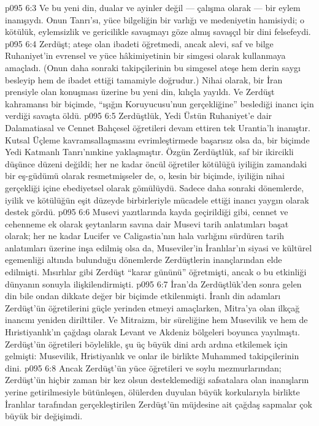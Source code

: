 \vs p095 6:3 Ve bu yeni din, dualar ve ayinler değil --- çalışma olarak --- bir eylem inanışıydı. Onun Tanrı’sı, yüce bilgeliğin bir varlığı ve medeniyetin hamisiydi; o kötülük, eylemsizlik ve gericilikle savaşmayı göze almış savaşçıl bir dini felsefeydi.
\vs p095 6:4 Zerdüşt; ateşe olan ibadeti öğretmedi, ancak alevi, saf ve bilge Ruhaniyet’in evrensel ve yüce hâkimiyetinin bir simgesi olarak kullanmaya amaçladı. (Onun daha sonraki takipçilerinin bu simgesel ateşe hem derin saygı besleyip hem de ibadet ettiği tamamiyle doğrudur.) Nihai olarak, bir İran prensiyle olan konuşması üzerine bu yeni din, kılıçla yayıldı. Ve Zerdüşt kahramansı bir biçimde, “ışığın Koruyucusu’nun gerçekliğine” beslediği inancı için verdiği savaşta öldü.
\vs p095 6:5 Zerdüştlük, Yedi Üstün Ruhaniyet’e dair Dalamatiasal ve Cennet Bahçesel öğretileri devam ettiren tek Urantia’lı inanıştır. Kutsal Üçleme kavramsallaşmasını evrimleştirmede başarısız olsa da, bir biçimde Yedi Katmanlı Tanrı’nınkine yaklaşmıştır. Özgün Zerdüştlük, saf bir ikircikli düşünce düzeni değildi; her ne kadar öncül öğretiler kötülüğü iyiliğin zamandaki bir eş\hyp{}güdümü olarak resmetmişseler de, o, kesin bir biçimde, iyiliğin nihai gerçekliği içine ebediyetsel olarak gömülüydü. Sadece daha sonraki dönemlerde, iyilik ve kötülüğün eşit düzeyde birbirleriyle mücadele ettiği inancı yaygın olarak destek gördü.
\vs p095 6:6 Musevi yazıtlarında kayda geçirildiği gibi, cennet ve cehenneme ek olarak şeytanların savına dair Musevi tarih anlatımları başat olarak; her ne kadar Lucifer ve Caligastia’nın hala varlığını sürdüren tarih anlatımları üzerine inşa edilmiş olsa da, Museviler’in İranlılar’ın siyasi ve kültürel egemenliği altında bulunduğu dönemlerde Zerdüştlerin inançlarından elde edilmişti. Mısırlılar gibi Zerdüşt “karar gününü” öğretmişti, ancak o bu etkinliği dünyanın sonuyla ilişkilendirmişti.
\vs p095 6:7 İran’da Zerdüştlük’den sonra gelen din bile ondan dikkate değer bir biçimde etkilenmişti. İranlı din adamları Zerdüşt’ün öğretilerini güçle yerinden etmeyi amaçlarken, Mitra’ya olan ilkçağ inancını yeniden dirilttiler. Ve Mitraizm, bir süreliğine hem Musevilik ve hem de Hıristiyanlık’ın çağdaşı olarak Levant ve Akdeniz bölgeleri boyunca yayılmıştı. Zerdüşt’ün öğretileri böylelikle, şu üç büyük dini ardı ardına etkilemek için gelmişti: Musevilik, Hristiyanlık ve onlar ile birlikte Muhammed takipçilerinin dini.
\vs p095 6:8 Ancak Zerdüşt’ün yüce öğretileri ve soylu mezmurlarından; Zerdüşt’ün hiçbir zaman bir kez olsun desteklemediği safsatalara olan inanışların yerine getirilmesiyle bütünleşen, ölülerden duyulan büyük korkularıyla birlikte İranlılar tarafından gerçekleştirilen Zerdüşt’ün müjdesine ait çağdaş sapmalar çok büyük bir değişimdi.
